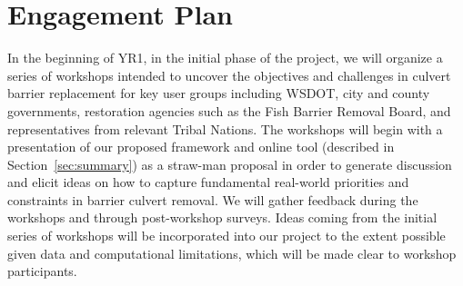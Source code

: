 \documentclass[12pt]{elsarticle}
\begin{document}

\section{Engagement Plan}\label{sec:engage} %

In the beginning of YR1, in the initial phase of the project, we will organize a series of workshops intended to uncover the objectives and challenges in culvert barrier replacement for key user groups including WSDOT, city and county governments, restoration agencies such as the Fish Barrier Removal Board, and representatives from relevant Tribal Nations. The workshops will begin with a presentation of our proposed framework and online tool (described in Section~\ref{sec:summary}) as a straw-man proposal in order to generate discussion and elicit ideas on how to capture fundamental real-world priorities and constraints in barrier culvert removal. We will gather feedback during the workshops and through post-workshop surveys. Ideas coming from the initial series of workshops will be incorporated into our project to the extent possible given data and computational limitations, which will be made clear to workshop participants.
\end{document}

